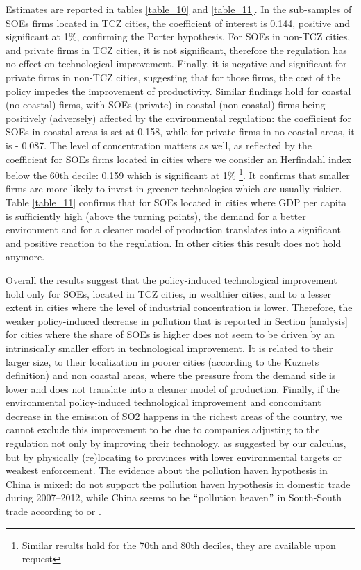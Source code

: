 \documentclass[12pt]{article}
\begin{document}
Estimates are reported in tables \ref{table_10} and \ref{table_11}. In the sub-samples of SOEs firms located in TCZ cities, the coefficient of interest is 0.144, positive and significant at 1$\%$, confirming the Porter hypothesis. For SOEs in non-TCZ cities, and private firms in TCZ cities, it is not significant, therefore the regulation has no effect on technological improvement. Finally, it is negative and significant for private firms in non-TCZ cities, suggesting that for those firms, the cost of the policy impedes the improvement of productivity. Similar findings hold for coastal (no-coastal) firms, with SOEs (private) in coastal (non-coastal) firms being positively (adversely) affected by the environmental regulation: the coefficient for SOEs in coastal areas is set at 0.158, while for private firms in no-coastal areas, it is - 0.087. The level of concentration matters as well, as reflected by the coefficient for SOEs firms located in cities where we consider an Herfindahl index below the 60th decile: 0.159 which is significant at 1$\%$ \footnote{Similar results hold for the 70th and 80th deciles, they are available upon request}. It confirms that smaller firms are more likely to invest in greener technologies which are usually riskier. Table \ref{table_11} confirms that for SOEs located in cities where GDP per capita is sufficiently high (above the turning points), the demand for a better environment and for a cleaner model of production translates into a significant and positive reaction to the regulation. In other cities this result does not hold anymore. 


Overall the results suggest that the policy-induced technological improvement hold only for SOEs, located in TCZ cities, in wealthier cities, and to a lesser extent in cities where the level of industrial concentration is lower. Therefore, the weaker policy-induced decrease in pollution that is reported in Section \ref{analysis} for cities where the share of SOEs is higher does not seem to be driven by an intrinsically smaller effort in technological improvement. It is related to their larger size, to their localization in poorer cities (according to the Kuznets definition) and non coastal areas, where the pressure from the demand side is lower and does not translate into a cleaner model of production. Finally, if the environmental policy-induced technological improvement and concomitant decrease in the emission of SO2 happens in the richest areas of the country, we cannot exclude this improvement to be due to companies adjusting to the regulation not only by improving their technology, as suggested by our calculus, but by physically (re)locating to provinces with lower environmental targets or weakest enforcement. The evidence about the pollution haven hypothesis in China is mixed: \cite{Wang2019-ju} do not support the pollution haven hypothesis in domestic trade during 2007–2012, while China seems to be $``$pollution heaven$"$ in South-South trade according to \cite{Lin2019-ft} or \cite{Sun2017-la}.
\end{document}
